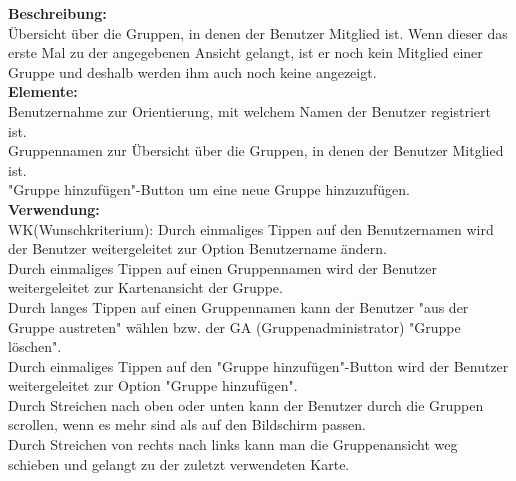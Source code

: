 \textbf{Beschreibung:}\\
Übersicht über die Gruppen, in denen der Benutzer Mitglied ist. Wenn dieser das erste Mal zu der angegebenen Ansicht gelangt, ist er noch kein Mitglied einer Gruppe und deshalb werden ihm auch noch keine angezeigt.\\
\textbf{Elemente:}\\
Benutzernahme zur Orientierung, mit welchem Namen der Benutzer registriert ist.\\
Gruppennamen zur Übersicht über die Gruppen, in denen der Benutzer Mitglied ist.\\
"Gruppe hinzufügen"-Button um eine neue Gruppe hinzuzufügen.\\
\textbf{Verwendung:}\\
WK(Wunschkriterium): Durch einmaliges Tippen auf den Benutzernamen wird der Benutzer weitergeleitet zur Option Benutzername ändern.\\
Durch einmaliges Tippen auf einen Gruppennamen wird der Benutzer weitergeleitet zur Kartenansicht der Gruppe.\\
Durch langes Tippen auf einen Gruppennamen kann der Benutzer "aus der Gruppe austreten" wählen bzw. der GA (Gruppenadministrator) "Gruppe löschen".\\
Durch einmaliges Tippen auf den "Gruppe hinzufügen"-Button wird der Benutzer weitergeleitet zur Option "Gruppe hinzufügen".\\
Durch Streichen nach oben oder unten kann der Benutzer durch die Gruppen scrollen, wenn es mehr sind als auf den Bildschirm passen.\\
Durch Streichen von rechts nach links kann man die Gruppenansicht weg schieben und gelangt zu der zuletzt verwendeten Karte.
\newpage



